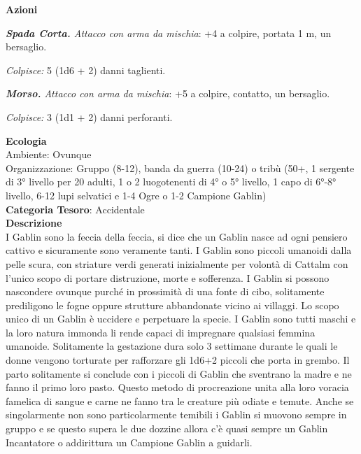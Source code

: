\begin{multicols}{2}
{\textbf{Azioni}

\emph{\textbf{Spada Corta.} Attacco con arma da mischia}: +4 a colpire, portata 1 m, un bersaglio.

\emph{Colpisce:} 5 (1d6 + 2) danni taglienti.

\emph{\textbf{Morso.} Attacco con arma da mischia}: +5 a colpire, contatto, un bersaglio.

\emph{Colpisce:} 3 (1d1 + 2) danni perforanti.

\textbf{Ecologia}\\
Ambiente: Ovunque\\
Organizzazione: Gruppo (8-12), banda da guerra (10-24) o tribù (50+, 1 sergente di 3° livello per 20 adulti, 1 o 2 luogotenenti di 4° o 5° livello, 1 capo di 6°-8° livello, 6-12 lupi selvatici e 1-4 Ogre o 1-2 Campione Gablin)\\
\textbf{Categoria Tesoro}: Accidentale\\
\textbf{Descrizione}\\
I Gablin sono la feccia della feccia, si dice che un Gablin nasce ad ogni pensiero cattivo e sicuramente sono veramente tanti.
I Gablin sono piccoli umanoidi dalla pelle scura, con striature verdi generati inizialmente per volontà di Cattalm con l'unico scopo di portare distruzione, morte e sofferenza.
I Gablin si possono nascondere ovunque purché in prossimità di una fonte di cibo, solitamente prediligono le fogne oppure strutture abbandonate vicino ai villaggi.
Lo scopo unico di un Gablin è uccidere e perpetuare la specie. I Gablin sono tutti maschi e la loro natura immonda li rende capaci di impregnare qualsiasi femmina umanoide.
Solitamente la gestazione dura solo 3 settimane durante le quali le donne vengono torturate per rafforzare gli 1d6+2 piccoli che porta in grembo. Il parto solitamente si conclude con i piccoli di Gablin che sventrano la madre e ne fanno il primo loro pasto.
Questo metodo di procreazione unita alla loro voracia famelica di sangue e carne ne fanno tra le creature più odiate e temute.
Anche se singolarmente non sono particolarmente temibili i Gablin si muovono sempre in gruppo e se questo supera le due dozzine allora c'è quasi sempre un Gablin Incantatore o addirittura un Campione Gablin a guidarli.

}
\end{multicols}
